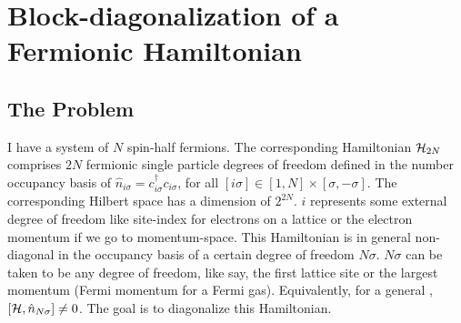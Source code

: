 \documentclass[12pt]{article}
\newcommand{\hml}{\ensuremath{\ham_{2N}}}
\begin{document}
\newpage

\section{Block-diagonalization of a Fermionic Hamiltonian}

\subsection{The Problem}
I have a system of \(N\) spin-half fermions. The corresponding Hamiltonian \(\hml\) comprises \(2N\) fermionic single particle degrees of freedom defined in the number occupancy basis of \(\hat{n}_{i\sigma} = c^\dagger_{i\sigma}c_{i\sigma}\), for all \([i\sigma]\in[1,N]\times[\sigma,-\sigma]\). The corresponding Hilbert space has a dimension of \(2^{2N}\). \(i\) represents some external degree of freedom like site-index for electrons on a lattice or the electron momentum if we go to momentum-space. This Hamiltonian is in general non-diagonal in the occupancy basis of a certain degree of freedom \(N\sigma\). \(N\sigma\) can be taken to be any degree of freedom, like say, the first lattice site or the largest momentum (Fermi momentum for a Fermi gas). Equivalently, for a general \ham, \(\left[{\mathcal{H}, \hat{n}_{N\sigma}}\right]\neq 0\). The goal is to diagonalize this Hamiltonian. 
\end{document}
